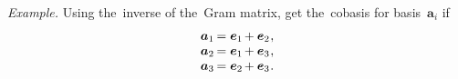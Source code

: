 \begin{otherlanguage}{russian}
\begin{tcolorbox}
\small\setlength{\abovedisplayskip}{2pt}\setlength{\belowdisplayskip}{2pt}

\emph{Example.} Using the~inverse of the~Gram matrix, get the~cobasis for basis~$\bm{a}_i$
if
\[ \begin{array}{l}
\bm{a}_1 \hspace{-0.2ex} = \bm{e}_1 \hspace{-0.2ex} + \bm{e}_2 \hspace{.1ex} , \\
\bm{a}_2 \hspace{-0.2ex} = \bm{e}_1 \hspace{-0.2ex} + \bm{e}_3 \hspace{.1ex} , \\
\bm{a}_3 \hspace{-0.2ex} = \bm{e}_2 \hspace{-0.2ex} + \bm{e}_3 \hspace{.1ex} .
\end{array} \]


\end{tcolorbox}
\end{otherlanguage}
